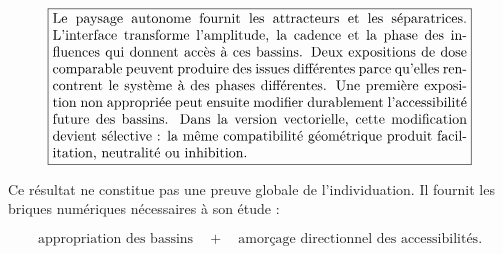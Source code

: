 \[
\boxed{
\begin{minipage}{0.86\linewidth}
Le paysage autonome fournit les attracteurs et les séparatrices.
L'interface transforme l'amplitude, la cadence et la phase des
influences qui donnent accès à ces bassins. Deux expositions de dose
comparable peuvent produire des issues différentes parce qu'elles
rencontrent le système à des phases différentes. Une première
exposition non appropriée peut ensuite modifier durablement
l'accessibilité future des bassins. Dans la version vectorielle, cette
modification devient sélective : la même compatibilité géométrique
produit facilitation, neutralité ou inhibition.
\end{minipage}
}
\]

Ce résultat ne constitue pas une preuve globale de l'individuation. Il
fournit les briques numériques nécessaires à son étude :

\[
\text{appropriation des bassins}
\quad+\quad
\text{amorçage directionnel des accessibilités}.
\]
